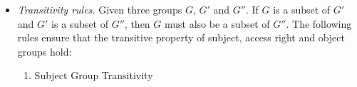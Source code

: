 \documentclass[global,twocolumn,final]{svjour}
\newenvironment{vquote}
  {\begin{list}{}{\leftmargin 1em}\item[]}
  {\end{list}}
\begin{document}
\begin{itemize}

            \item
              {\em Transitivity rules.}
              Given three groups $G$, $G'$ and $G''$. If $G$ is a subset of
              $G'$ and $G'$ is a subset of $G''$, then $G$ must also be a
              subset of $G''$. The following rules ensure that the transitive
              property of subject, access right and object groups hold:

              \begin{enumerate}
                \item
                  Subject Group Transitivity


\end{enumerate}
\end{itemize}
\end{document}
